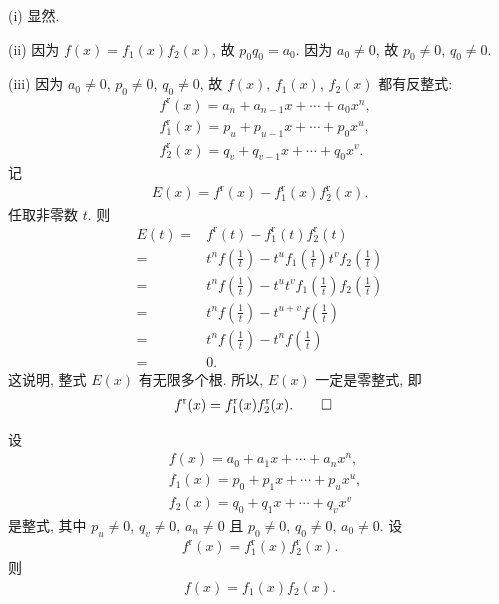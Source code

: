 \begin{pf}
    (i) 显然.

    (ii) 因为 $f(x) = f_1 (x) f_2 (x)$, 故 $p_0 q_0 = a_0$. 因为 $a_0 \neq 0$, 故 $p_0 \neq 0$, $q_0 \neq 0$.

    (iii) 因为 $a_0 \neq 0$, $p_0 \neq 0$, $q_0 \neq 0$, 故 $f(x)$, $f_1 (x)$, $f_2 (x)$ 都有反整式:
    \begin{align*}
         & f^{\mathrm{r}} (x) = a_n + a_{n-1} x + \cdots + a_0 x^n,   \\
         & f_1^{\mathrm{r}} (x) = p_u + p_{u-1} x + \cdots + p_0 x^u, \\
         & f_2^{\mathrm{r}} (x) = q_v + q_{v-1} x + \cdots + q_0 x^v.
    \end{align*}
    记
    \begin{align*}
        E(x) = f^{\mathrm{r}} (x) - f_1^{\mathrm{r}} (x) f_2^{\mathrm{r}} (x).
    \end{align*}
    任取非零数 $t$. 则
    \begin{align*}
        E(t)
        = {} & f^{\mathrm{r}} (t) - f_1^{\mathrm{r}} (t) f_2^{\mathrm{r}} (t)                                           \\
        = {} & t^n f \left( \frac{1}{t} \right) - t^u f_1 \left( \frac{1}{t} \right) t^v f_2 \left( \frac{1}{t} \right) \\
        = {} & t^n f \left( \frac{1}{t} \right) - t^u t^v f_1 \left( \frac{1}{t} \right) f_2 \left( \frac{1}{t} \right) \\
        = {} & t^n f \left( \frac{1}{t} \right) - t^{u+v} f \left( \frac{1}{t} \right)                                  \\
        = {} & t^n f \left( \frac{1}{t} \right) - t^n f \left( \frac{1}{t} \right)                                      \\
        = {} & 0.
    \end{align*}
    这说明, 整式 $E(x)$ 有无限多个根. 所以, $E(x)$ 一定是零整式, 即
    \begin{align*}
         & f^{\mathrm{r}} (x) = f_1^{\mathrm{r}} (x) f_2^{\mathrm{r}} (x). \qedhere
    \end{align*}
\end{pf}

\begin{proposition}
    设
    \begin{align*}
         & f(x) = a_0 + a_1 x + \cdots + a_n x^n,    \\
         & f_1 (x) = p_0 + p_1 x + \cdots + p_u x^u, \\
         & f_2 (x) = q_0 + q_1 x + \cdots + q_v x^v
    \end{align*}
    是整式, 其中 $p_u \neq 0$, $q_v \neq 0$, $a_n \neq 0$ 且 $p_0 \neq 0$, $q_0 \neq 0$, $a_0 \neq 0$. 设
    \begin{align*}
        f^{\mathrm{r}} (x) = f_1^{\mathrm{r}} (x) f_2^{\mathrm{r}} (x).
    \end{align*}
    则
    \begin{align*}
        f(x) = f_1 (x) f_2 (x).
    \end{align*}
\end{proposition}

